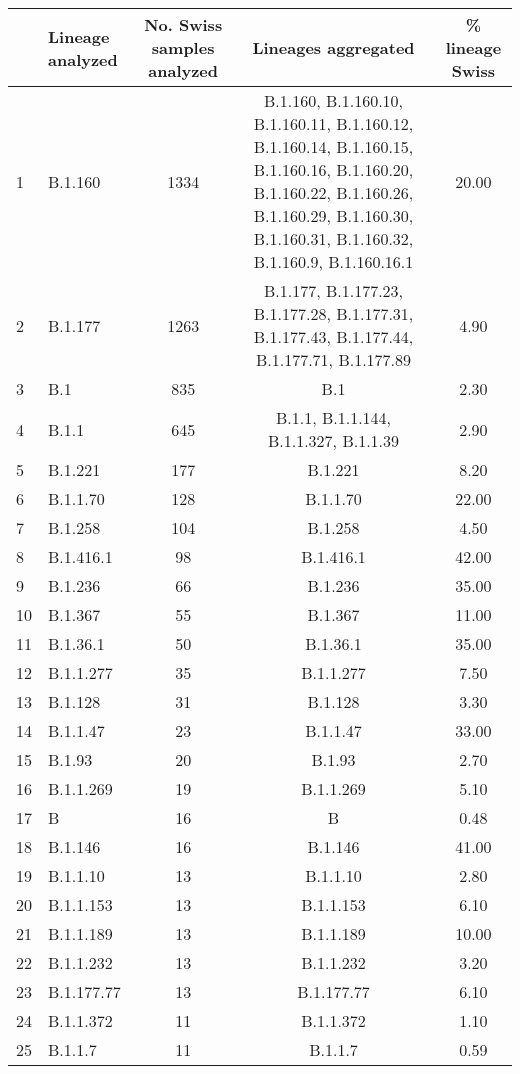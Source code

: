 \begin{longtable}{lp{4cm}ccc}
  \hline
 & Lineage analyzed & No. Swiss samples analyzed & Lineages aggregated & \% lineage Swiss \\ 
  \hline
1 & B.1.160 & 1334 & B.1.160, B.1.160.10, B.1.160.11, B.1.160.12, B.1.160.14, B.1.160.15, B.1.160.16, B.1.160.20, B.1.160.22, B.1.160.26, B.1.160.29, B.1.160.30, B.1.160.31, B.1.160.32, B.1.160.9, B.1.160.16.1 & 20.00 \\ 
  2 & B.1.177 & 1263 & B.1.177, B.1.177.23, B.1.177.28, B.1.177.31, B.1.177.43, B.1.177.44, B.1.177.71, B.1.177.89 & 4.90 \\ 
  3 & B.1 & 835 & B.1 & 2.30 \\ 
  4 & B.1.1 & 645 & B.1.1, B.1.1.144, B.1.1.327, B.1.1.39 & 2.90 \\ 
  5 & B.1.221 & 177 & B.1.221 & 8.20 \\ 
  6 & B.1.1.70 & 128 & B.1.1.70 & 22.00 \\ 
  7 & B.1.258 & 104 & B.1.258 & 4.50 \\ 
  8 & B.1.416.1 &  98 & B.1.416.1 & 42.00 \\ 
  9 & B.1.236 &  66 & B.1.236 & 35.00 \\ 
  10 & B.1.367 &  55 & B.1.367 & 11.00 \\ 
  11 & B.1.36.1 &  50 & B.1.36.1 & 35.00 \\ 
  12 & B.1.1.277 &  35 & B.1.1.277 & 7.50 \\ 
  13 & B.1.128 &  31 & B.1.128 & 3.30 \\ 
  14 & B.1.1.47 &  23 & B.1.1.47 & 33.00 \\ 
  15 & B.1.93 &  20 & B.1.93 & 2.70 \\ 
  16 & B.1.1.269 &  19 & B.1.1.269 & 5.10 \\ 
  17 & B &  16 & B & 0.48 \\ 
  18 & B.1.146 &  16 & B.1.146 & 41.00 \\ 
  19 & B.1.1.10 &  13 & B.1.1.10 & 2.80 \\ 
  20 & B.1.1.153 &  13 & B.1.1.153 & 6.10 \\ 
  21 & B.1.1.189 &  13 & B.1.1.189 & 10.00 \\ 
  22 & B.1.1.232 &  13 & B.1.1.232 & 3.20 \\ 
  23 & B.1.177.77 &  13 & B.1.177.77 & 6.10 \\ 
  24 & B.1.1.372 &  11 & B.1.1.372 & 1.10 \\ 
  25 & B.1.1.7 &  11 & B.1.1.7 & 0.59 \\ 

\end{longtable}
